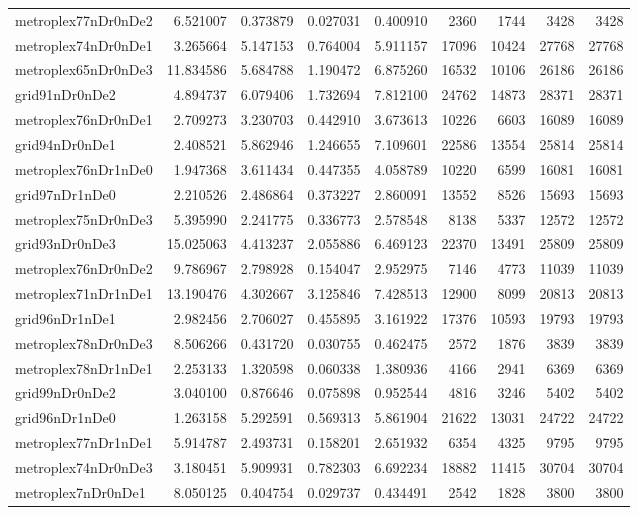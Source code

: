 \begin{longtable}{|l|r|r|r|r|r|r|r|r|}
metroplex77nDr0nDe2 & 6.521007 & 0.373879 & 0.027031 & 0.400910 & 2360 & 1744 & 3428 & 3428 \\
metroplex74nDr0nDe1 & 3.265664 & 5.147153 & 0.764004 & 5.911157 & 17096 & 10424 & 27768 & 27768 \\
metroplex65nDr0nDe3 & 11.834586 & 5.684788 & 1.190472 & 6.875260 & 16532 & 10106 & 26186 & 26186 \\
grid91nDr0nDe2 & 4.894737 & 6.079406 & 1.732694 & 7.812100 & 24762 & 14873 & 28371 & 28371 \\
metroplex76nDr0nDe1 & 2.709273 & 3.230703 & 0.442910 & 3.673613 & 10226 & 6603 & 16089 & 16089 \\
grid94nDr0nDe1 & 2.408521 & 5.862946 & 1.246655 & 7.109601 & 22586 & 13554 & 25814 & 25814 \\
metroplex76nDr1nDe0 & 1.947368 & 3.611434 & 0.447355 & 4.058789 & 10220 & 6599 & 16081 & 16081 \\
grid97nDr1nDe0 & 2.210526 & 2.486864 & 0.373227 & 2.860091 & 13552 & 8526 & 15693 & 15693 \\
metroplex75nDr0nDe3 & 5.395990 & 2.241775 & 0.336773 & 2.578548 & 8138 & 5337 & 12572 & 12572 \\
grid93nDr0nDe3 & 15.025063 & 4.413237 & 2.055886 & 6.469123 & 22370 & 13491 & 25809 & 25809 \\
metroplex76nDr0nDe2 & 9.786967 & 2.798928 & 0.154047 & 2.952975 & 7146 & 4773 & 11039 & 11039 \\
metroplex71nDr1nDe1 & 13.190476 & 4.302667 & 3.125846 & 7.428513 & 12900 & 8099 & 20813 & 20813 \\
grid96nDr1nDe1 & 2.982456 & 2.706027 & 0.455895 & 3.161922 & 17376 & 10593 & 19793 & 19793 \\
metroplex78nDr0nDe3 & 8.506266 & 0.431720 & 0.030755 & 0.462475 & 2572 & 1876 & 3839 & 3839 \\
metroplex78nDr1nDe1 & 2.253133 & 1.320598 & 0.060338 & 1.380936 & 4166 & 2941 & 6369 & 6369 \\
grid99nDr0nDe2 & 3.040100 & 0.876646 & 0.075898 & 0.952544 & 4816 & 3246 & 5402 & 5402 \\
grid96nDr1nDe0 & 1.263158 & 5.292591 & 0.569313 & 5.861904 & 21622 & 13031 & 24722 & 24722 \\
metroplex77nDr1nDe1 & 5.914787 & 2.493731 & 0.158201 & 2.651932 & 6354 & 4325 & 9795 & 9795 \\
metroplex74nDr0nDe3 & 3.180451 & 5.909931 & 0.782303 & 6.692234 & 18882 & 11415 & 30704 & 30704 \\
metroplex7nDr0nDe1 & 8.050125 & 0.404754 & 0.029737 & 0.434491 & 2542 & 1828 & 3800 & 3800 \\

\end{longtable}
